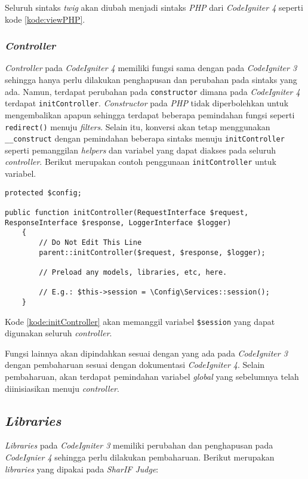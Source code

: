 Seluruh sintaks \textit{twig} akan diubah menjadi sintaks \textit{PHP} dari \textit{CodeIgniter 4} seperti kode \ref{kode:viewPHP}.

\subsubsection{\textit{Controller}}
\textit{Controller} pada \textit{CodeIgniter 4} memiliki fungsi sama dengan pada \textit{CodeIgniter 3} sehingga hanya perlu dilakukan penghapusan dan perubahan pada sintaks yang ada. Namun, terdapat perubahan pada \texttt{constructor} dimana pada \textit{CodeIgniter 4} terdapat \texttt{initController}. \textit{Constructor} pada \textit{PHP} tidak diperbolehkan untuk mengembalikan apapun sehingga terdapat beberapa pemindahan fungsi seperti \texttt{redirect()} menuju \textit{filters}. Selain itu, konversi akan tetap menggunakan \verb|__construct| dengan pemindahan beberapa sintaks menuju \texttt{initController} seperti pemanggilan \textit{helpers} dan variabel yang dapat diakses pada seluruh \textit{controller}. Berikut merupakan contoh penggunaan \texttt{initController} untuk variabel.

\begin{lstlisting}[caption=Contoh penggunaan initController untuk variabel, label=kode:initController]
protected $config;

public function initController(RequestInterface $request, ResponseInterface $response, LoggerInterface $logger)
    {
        // Do Not Edit This Line
        parent::initController($request, $response, $logger);

        // Preload any models, libraries, etc, here.

        // E.g.: $this->session = \Config\Services::session();
    }
\end{lstlisting}

Kode \ref{kode:initController} akan memanggil variabel \verb|$session| yang dapat digunakan seluruh \textit{controller}.

Fungsi lainnya akan dipindahkan sesuai dengan yang ada pada \textit{CodeIgniter 3} dengan pembaharuan sesuai dengan dokumentasi \textit{CodeIgniter 4}. Selain pembaharuan, akan terdapat pemindahan variabel \textit{global} yang sebelumnya telah diinisiasikan menuju \textit{controller}.

\subsection{\textit{Libraries}}
\textit{Libraries} pada \textit{CodeIgniter 3} memiliki perubahan dan penghapusan pada \textit{CodeIgnier 4} sehingga perlu dilakukan pembaharuan. Berikut merupakan \textit{libraries} yang dipakai pada \textit{SharIF Judge}:

